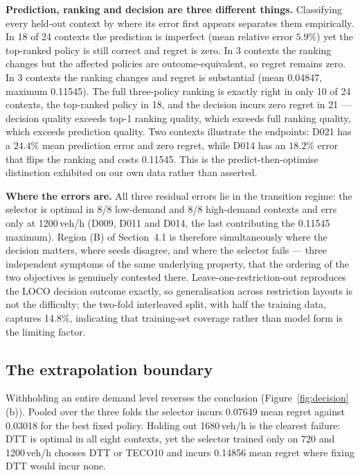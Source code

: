 \documentclass[10pt,a4paper]{article}
\begin{document}
\textbf{Prediction, ranking and decision are three different things.} Classifying every held-out context by where its error first appears separates them empirically. In 18 of 24 contexts the prediction is imperfect (mean relative error $5.9\%$) yet the top-ranked policy is still correct and regret is zero. In 3 contexts the ranking changes but the affected policies are outcome-equivalent, so regret remains zero. In 3 contexts the ranking changes and regret is substantial (mean 0.04847, maximum 0.11545). The full three-policy ranking is exactly right in only 10 of 24 contexts, the top-ranked policy in 18, and the decision incurs zero regret in 21 --- decision quality exceeds top-1 ranking quality, which exceeds full ranking quality, which exceeds prediction quality. Two contexts illustrate the endpoints: D021 has a $24.4\%$ mean prediction error and zero regret, while D014 has an $18.2\%$ error that flips the ranking and costs 0.11545. This is the predict-then-optimise distinction \cite{elmachtoub2022smart} exhibited on our own data rather than asserted.

\textbf{Where the errors are.} All three residual errors lie in the transition regime: the selector is optimal in 8/8 low-demand and 8/8 high-demand contexts and errs only at 1200\,veh/h (D009, D011 and D014, the last contributing the 0.11545 maximum). Region (B) of Section~4.1 is therefore simultaneously where the decision matters, where seeds disagree, and where the selector fails --- three independent symptoms of the same underlying property, that the ordering of the two objectives is genuinely contested there. Leave-one-restriction-out reproduces the LOCO decision outcome exactly, so generalisation across restriction layouts is not the difficulty; the two-fold interleaved split, with half the training data, captures 14.8\%, indicating that training-set coverage rather than model form is the limiting factor.

\subsection{The extrapolation boundary}
Withholding an entire demand level reverses the conclusion (Figure~\ref{fig:decision}(b)). Pooled over the three folds the selector incurs 0.07649 mean regret against 0.03018 for the best fixed policy. Holding out 1680\,veh/h is the clearest failure: DTT is optimal in all eight contexts, yet the selector trained only on 720 and 1200\,veh/h chooses DTT or TECO10 and incurs 0.14856 mean regret where fixing DTT would incur none.
\end{document}
